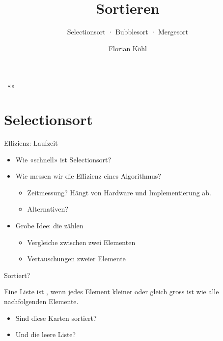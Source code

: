 \title{Sortieren}
\subtitle{Selectionsort · Bubblesort · Mergesort}
\author{Florian Köhl}



\sbtitleframe

\begin{frame}{\sbdesignid\ «\sbdesignname»}
  \sbpitchpage
\end{frame}

\setcounter{section}{1}
\section{Selectionsort}

\begin{frame}{Effizienz: Laufzeit}
  \begin{itemize}
    \item Wie «schnell» ist Selectionsort?
    \item Wie messen wir die Effizienz eines Algorithmus?
      \begin{itemize}
        \item Zeitmessung? Hängt von Hardware und Implementierung ab.
        \item Alternativen?
      \end{itemize}
    \item Grobe Idee: die  zählen
      \begin{itemize}
        \item Vergleiche zwischen zwei Elementen
        \item Vertauschungen zweier Elemente
      \end{itemize}
  \end{itemize}
\end{frame}

\begin{frame}{Sortiert?}
  \begin{concept}
    Eine Liste ist , wenn jedes Element kleiner
    oder gleich gross ist wie alle nachfolgenden Elemente.
  \end{concept}
  \begin{itemize}
    \item Sind diese Karten sortiert?
    \item Und die leere Liste?
  \end{itemize}
\end{frame}

